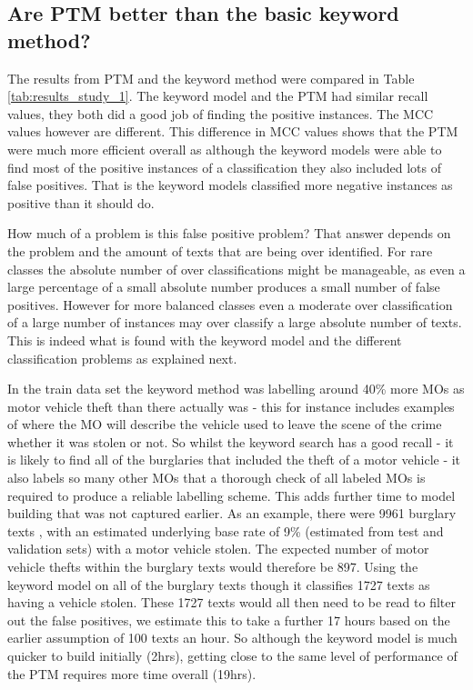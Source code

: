 \subsection{Are PTM better than the basic keyword method?} The results from PTM and the keyword method were compared in Table \ref{tab:results_study_1}. The keyword model and the PTM had similar recall values, they both did a good job of finding the positive instances. The MCC values however are different. This difference in MCC values shows that the PTM were much more efficient overall as although the keyword models were able to find most of the positive instances of a classification they also included lots of false positives. That is the keyword models classified more negative instances as positive than it should do. 

How much of a problem is this false positive problem? That answer depends on the problem and the amount of texts that are being over identified. For rare classes the absolute number of over classifications might be manageable, as even a large percentage of a small absolute number produces a small number of false positives. However for more balanced classes even a moderate over classification of a large number of instances may over classify a large absolute number of texts. This is indeed what is found with the keyword model and the different classification problems as explained next.

In the train data set the keyword method was labelling around 40\% more MOs as motor vehicle theft than there actually was - this for instance includes examples of where the MO will describe the vehicle used to leave the scene of the crime whether it was stolen or not. So whilst the keyword search has a good recall - it is likely to find all of the burglaries that included the theft of a motor vehicle - it also labels so many other MOs that a thorough check of all labeled MOs is required to produce a reliable labelling scheme. This adds further time to model building that was not captured earlier. As an example, there were 9961 burglary texts , with an estimated underlying base rate of  9\% (estimated from test and validation sets) with a motor vehicle stolen. The expected number of motor vehicle thefts within the burglary texts would therefore be 897. Using the keyword model on all of the burglary texts though it classifies 1727 texts as having a vehicle stolen.  These 1727 texts would all then need to be read to filter out the false positives, we estimate this to take a further 17 hours based on the earlier assumption of 100 texts an hour. So although the keyword model is much quicker to build initially (2hrs), getting close to the same level of performance of the PTM requires more time overall (19hrs). 

